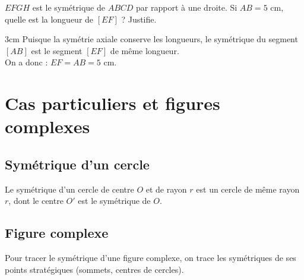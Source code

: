 \documentclass[a4paper]{book}
\begin{document}
    
    \begin{methode}
        $EFGH$ est le symétrique de $ABCD$ par rapport à une droite. Si $AB = 5$ cm, quelle est la longueur de $[EF]$ ? Justifie.
        \begin{ZoneReponse}{3cm}
            \color{ForestGreen}
            Puisque la symétrie axiale conserve les longueurs, le symétrique du segment $[AB]$ est le segment $[EF]$ de même longueur. \\
            On a donc : $EF = AB = 5\text{ cm}$.
        \end{ZoneReponse}
    \end{methode}
    
    
\section{Cas particuliers et figures complexes}
    
    \subsection{Symétrique d'un cercle}
    \begin{propriete}
        Le symétrique d'un cercle de centre $O$ et de rayon $r$ est un cercle de même rayon $r$, dont le centre $O'$ est le symétrique de $O$.
    \end{propriete}
    
    \begin{center}
    \end{center}
    
\subsection{Figure complexe}
        Pour tracer le symétrique d'une figure complexe, on trace les symétriques de ses points stratégiques (sommets, centres de cercles).
        
\end{document}
